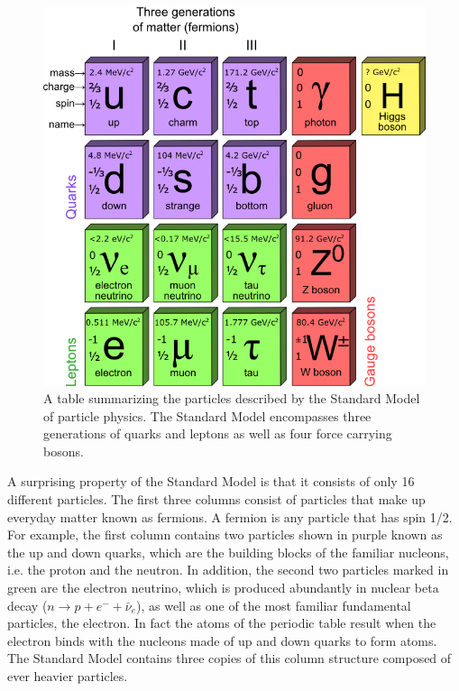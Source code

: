 \begin{figure}[htbp]
    \centering
    \includegraphics[scale=0.4, angle=0]{./figures/StandardModelPNG}
    \caption{A table summarizing the particles described by the
    Standard Model of particle physics. The Standard Model encompasses
    three generations of quarks and leptons as well as four force carrying
    bosons.}
    \label{fig:sm}
\end{figure}

A surprising property of the Standard Model is that it consists
of only 16 different particles. The first three columns consist of particles
that make up everyday matter known as fermions. A fermion is any particle that
has spin 1/2. 
For example, the first column contains two particles shown in purple known as
the up and down quarks, which are the building blocks of the familiar nucleons, 
i.e. the proton and the neutron. 
In addition, the second two particles marked in green
are the electron neutrino, which is produced abundantly in nuclear beta decay
($n \to p + e^- + \bar{\nu}_e$), as well as one of the most familiar fundamental
particles, the electron. In fact the atoms of the periodic table result when
the electron binds with the nucleons made of up and down quarks to form atoms. 
The Standard Model contains
three copies of this column structure composed of ever heavier particles.


